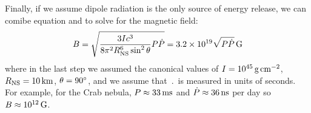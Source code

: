 Finally, if we assume dipole radiation is the only source of energy release, we
can comibe equation  and 
to solve for the magnetic field:
\begin{equation}
  B = \sqrt{\frac{3Ic^3}{8\pi^2R_\text{NS}^6\sin^2\theta}P\dot{P}}
  = 3.2\times 10^{19} \sqrt{P\dot{P}} \,\text{G}
\end{equation}
where in the last step we assumed the canonical values of $I=10^{45}\,\text{g}\,\text{cm}^{-2}$,
$R_\text{NS}=10\,\text{km}$, $\theta=90^\circ$, and we
assume that $\period$ is measured in units of seconds.
For example, for the Crab nebula, $P\approx33\,\text{ms}$ 
\citep{staelin_1968_pulsating-radio}
and $\dot{P}\approx36\,\text{ns}$ per day
\citep{richards_1969a_period-pulsar}
so $B\approx10^{12}\,\text{G}$.
